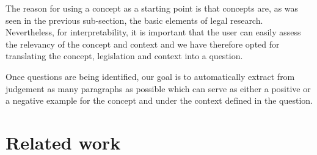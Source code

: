 The reason for using a concept as a starting point is that concepts are, as was seen in the previous sub-section, the basic elements of legal research. Nevertheless, for interpretability, it is important that the user can easily assess the relevancy of the concept and context and we have therefore opted for translating the concept, legislation and context into a question.


Once questions are being identified, our goal is to automatically extract from judgement as many paragraphs as possible which can serve as either a positive or a negative example for the concept and under the context defined in the question.

\section{Related work}
\label{sec:sota}


